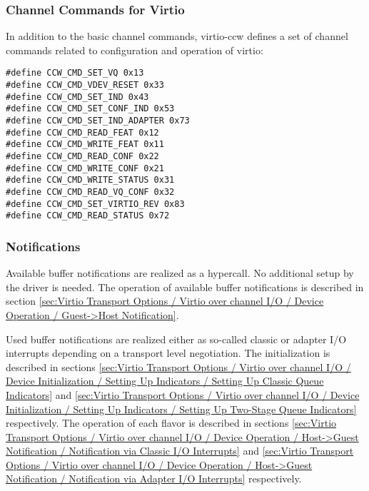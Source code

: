 \subsubsection{Channel Commands for Virtio}\label{sec:Virtio Transport Options / Virtio
over channel I/O / Basic Concepts/ Channel Commands for Virtio}

In addition to the basic channel commands, virtio-ccw defines a
set of channel commands related to configuration and operation of
virtio:

\begin{lstlisting}
#define CCW_CMD_SET_VQ 0x13
#define CCW_CMD_VDEV_RESET 0x33
#define CCW_CMD_SET_IND 0x43
#define CCW_CMD_SET_CONF_IND 0x53
#define CCW_CMD_SET_IND_ADAPTER 0x73
#define CCW_CMD_READ_FEAT 0x12
#define CCW_CMD_WRITE_FEAT 0x11
#define CCW_CMD_READ_CONF 0x22
#define CCW_CMD_WRITE_CONF 0x21
#define CCW_CMD_WRITE_STATUS 0x31
#define CCW_CMD_READ_VQ_CONF 0x32
#define CCW_CMD_SET_VIRTIO_REV 0x83
#define CCW_CMD_READ_STATUS 0x72
\end{lstlisting}

\subsubsection{Notifications}\label{sec:Virtio Transport Options / Virtio
over channel I/O / Basic Concepts/ Notifications}

Available buffer notifications are realized as a hypercall. No additional
setup by the driver is needed. The operation of available buffer
notifications is described in section \ref{sec:Virtio Transport Options /
Virtio over channel I/O / Device Operation / Guest->Host Notification}.

Used buffer notifications are realized either as so-called classic or
adapter I/O interrupts depending on a transport level negotiation. The
initialization is described in sections \ref{sec:Virtio Transport Options
/ Virtio over channel I/O / Device Initialization / Setting Up Indicators
/ Setting Up Classic Queue Indicators} and \ref{sec:Virtio Transport
Options / Virtio over channel I/O / Device Initialization / Setting Up
Indicators / Setting Up Two-Stage Queue Indicators} respectively.  The
operation of each flavor is described in sections \ref{sec:Virtio
Transport Options / Virtio over channel I/O / Device Operation /
Host->Guest Notification / Notification via Classic I/O Interrupts} and
\ref{sec:Virtio Transport Options / Virtio over channel I/O / Device
Operation / Host->Guest Notification / Notification via Adapter I/O
Interrupts} respectively. 

